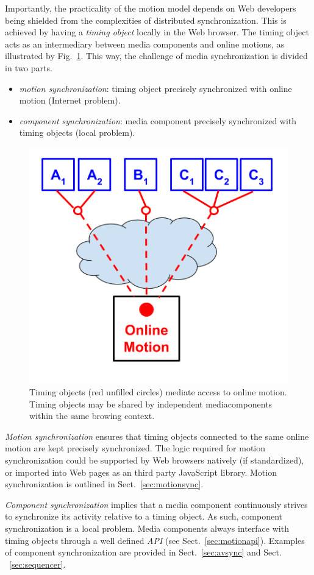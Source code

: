 Importantly, the practicality of the motion model depends on Web developers
being shielded from the complexities of distributed synchronization. This is
achieved by having a \emph{timing object} locally in the Web browser. The
timing object acts as an intermediary between media components and online
motions, as illustrated by Fig.~\ref{fig:model-2}. This way, the challenge of
media synchronization is divided in two parts.

\begin{itemize}
\item{\emph{motion synchronization}: timing object precisely synchronized with online motion (Internet problem).}
\item{\emph{component synchronization}: media component precisely synchronized with timing objects (local problem).} 
\end{itemize}


\begin{figure}[h]
\centering
\includegraphics[scale=.4]{fig/motion-model-2.png}
\caption{Timing objects (red unfilled circles) mediate access to online motion. Timing objects may be shared by independent mediacomponents within the same browing context.}
\label{fig:model-2}
\end{figure}

\emph{Motion synchronization} ensures that timing objects connected to the
same online motion are kept precisely synchronized. The logic required for
motion synchronization could be supported by Web browsers natively (if
standardized), or imported into Web pages as an third party JavaScript
library. Motion synchronization is outlined in Sect.~\ref{sec:motionsync}.

\emph{Component synchronization} implies that a media component continuously
strives to synchronize its activity relative to a timing object. As such,
component synchronization is a local problem. Media components always
interface with timing objects through a well defined \emph{API} (see
Sect.~\ref{sec:motionapi}). Examples of component synchronization are provided in Sect.~\ref{sec:avsync} and Sect.
~\ref{sec:sequencer}.

